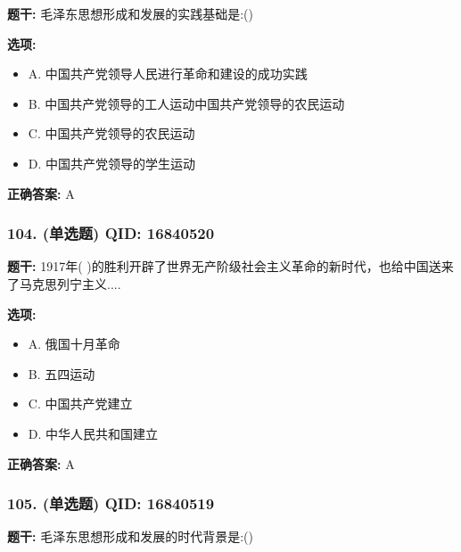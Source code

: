 \documentclass[12pt,UTF8]{ctexart}
\begin{document}
\textbf{题干:}
毛泽东思想形成和发展的实践基础是:()

\textbf{选项:}
\begin{itemize}[leftmargin=*]

  \item A. 中国共产党领导人民进行革命和建设的成功实践

  \item B. 中国共产党领导的工人运动中国共产党领导的农民运动

  \item C. 中国共产党领导的农民运动

  \item D. 中国共产党领导的学生运动

\end{itemize}

\textbf{正确答案:}
A

\vspace{0.3em}\hrulefill\vspace{0.7em}

\subsubsection*{104. (单选题) \small QID: 16840520}

\textbf{题干:}
1917年( )的胜利开辟了世界无产阶级社会主义革命的新时代，也给中国送来了马克思列宁主义....

\textbf{选项:}
\begin{itemize}[leftmargin=*]

  \item A. 俄国十月革命

  \item B. 五四运动

  \item C. 中国共产党建立

  \item D. 中华人民共和国建立

\end{itemize}

\textbf{正确答案:}
A

\vspace{0.3em}\hrulefill\vspace{0.7em}

\subsubsection*{105. (单选题) \small QID: 16840519}

\textbf{题干:}
毛泽东思想形成和发展的时代背景是:()
\end{document}
